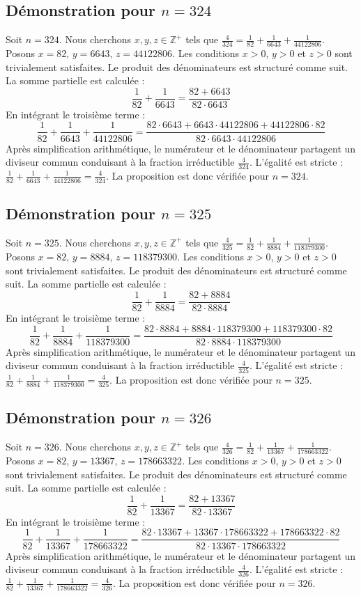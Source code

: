 \documentclass[11pt,a4paper]{article}
\begin{document}
\subsection{Démonstration pour $n = 324$}
Soit $n = 324$. Nous cherchons $x, y, z \in \mathbb{Z}^{+}$ tels que $\frac{4}{324} = \frac{1}{82} + \frac{1}{6643} + \frac{1}{44122806}$.
Posons $x = 82$, $y = 6643$, $z = 44122806$.
Les conditions $x > 0$, $y > 0$ et $z > 0$ sont trivialement satisfaites.
Le produit des dénominateurs est structuré comme suit. La somme partielle est calculée :
$$ \frac{1}{82} + \frac{1}{6643} = \frac{82+6643}{82 \cdot 6643} $$
En intégrant le troisième terme :
$$ \frac{1}{82} + \frac{1}{6643} + \frac{1}{44122806} = \frac{82 \cdot 6643 + 6643 \cdot 44122806 + 44122806 \cdot 82}{82 \cdot 6643 \cdot 44122806} $$
Après simplification arithmétique, le numérateur et le dénominateur partagent un diviseur commun conduisant à la fraction irréductible $\frac{4}{324}$.
L'égalité est stricte : $\frac{1}{82} + \frac{1}{6643} + \frac{1}{44122806} = \frac{4}{324}$.
La proposition est donc vérifiée pour $n = 324$.
\subsection{Démonstration pour $n = 325$}
Soit $n = 325$. Nous cherchons $x, y, z \in \mathbb{Z}^{+}$ tels que $\frac{4}{325} = \frac{1}{82} + \frac{1}{8884} + \frac{1}{118379300}$.
Posons $x = 82$, $y = 8884$, $z = 118379300$.
Les conditions $x > 0$, $y > 0$ et $z > 0$ sont trivialement satisfaites.
Le produit des dénominateurs est structuré comme suit. La somme partielle est calculée :
$$ \frac{1}{82} + \frac{1}{8884} = \frac{82+8884}{82 \cdot 8884} $$
En intégrant le troisième terme :
$$ \frac{1}{82} + \frac{1}{8884} + \frac{1}{118379300} = \frac{82 \cdot 8884 + 8884 \cdot 118379300 + 118379300 \cdot 82}{82 \cdot 8884 \cdot 118379300} $$
Après simplification arithmétique, le numérateur et le dénominateur partagent un diviseur commun conduisant à la fraction irréductible $\frac{4}{325}$.
L'égalité est stricte : $\frac{1}{82} + \frac{1}{8884} + \frac{1}{118379300} = \frac{4}{325}$.
La proposition est donc vérifiée pour $n = 325$.
\subsection{Démonstration pour $n = 326$}
Soit $n = 326$. Nous cherchons $x, y, z \in \mathbb{Z}^{+}$ tels que $\frac{4}{326} = \frac{1}{82} + \frac{1}{13367} + \frac{1}{178663322}$.
Posons $x = 82$, $y = 13367$, $z = 178663322$.
Les conditions $x > 0$, $y > 0$ et $z > 0$ sont trivialement satisfaites.
Le produit des dénominateurs est structuré comme suit. La somme partielle est calculée :
$$ \frac{1}{82} + \frac{1}{13367} = \frac{82+13367}{82 \cdot 13367} $$
En intégrant le troisième terme :
$$ \frac{1}{82} + \frac{1}{13367} + \frac{1}{178663322} = \frac{82 \cdot 13367 + 13367 \cdot 178663322 + 178663322 \cdot 82}{82 \cdot 13367 \cdot 178663322} $$
Après simplification arithmétique, le numérateur et le dénominateur partagent un diviseur commun conduisant à la fraction irréductible $\frac{4}{326}$.
L'égalité est stricte : $\frac{1}{82} + \frac{1}{13367} + \frac{1}{178663322} = \frac{4}{326}$.
La proposition est donc vérifiée pour $n = 326$.
\end{document}
